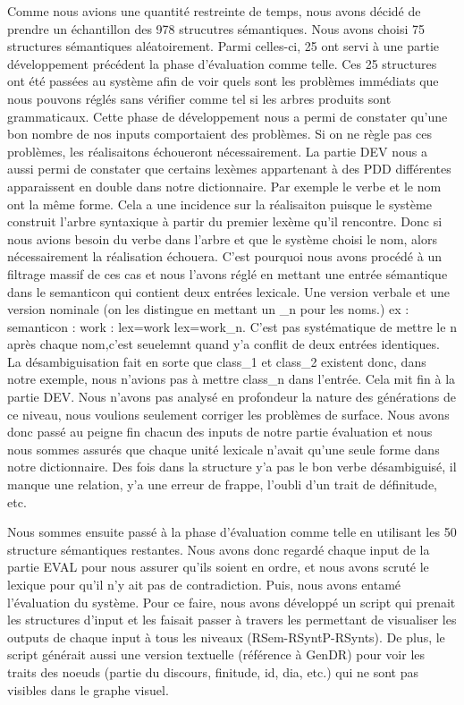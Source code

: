 Comme nous avions une quantité restreinte de temps, nous avons décidé de prendre un échantillon des 978 strucutres sémantiques. Nous avons choisi 75 structures sémantiques  aléatoirement. Parmi celles-ci, 25 ont servi à une partie développement précédent la phase d'évaluation comme telle. Ces 25 structures ont été passées au système afin de voir quels sont les problèmes immédiats que nous pouvons réglés sans vérifier comme tel si les arbres produits sont grammaticaux. Cette phase de développement nous a permi de constater qu'une bon nombre de nos inputs comportaient des problèmes. Si on ne règle pas ces problèmes, les réalisaitons échoueront nécessairement. La partie DEV nous a aussi permi de constater que certains lexèmes appartenant à des PDD différentes apparaissent en double dans notre dictionnaire. Par exemple le verbe  et le nom  ont la même forme. Cela a une incidence sur la réalisaiton puisque le système construit l'arbre syntaxique à partir du premier lexème qu'il rencontre. Donc si nous avions besoin du verbe dans l'arbre et que le système choisi le nom, alors nécessairement la réalisation échouera. C'est pourquoi nous avons procédé à un filtrage massif de ces cas et nous l'avons réglé en mettant une entrée sémantique dans le semanticon qui contient deux entrées lexicale. Une version verbale et une version nominale (on les distingue en mettant un \_n pour les noms.) ex : semanticon : work : lex=work lex=work\_n. C'est pas systématique de mettre le n après chaque nom,c'est seuelemnt quand y'a conflit de deux entrées identiques. La désambiguisation fait en sorte que class\_1 et class\_2 existent donc, dans notre exemple, nous n'avions pas à mettre class\_n dans l'entrée. Cela mit fin à la partie DEV.  Nous n'avons pas analysé en profondeur la nature des générations de ce niveau, nous voulions seulement corriger les problèmes de surface. Nous avons donc passé au peigne fin chacun des inputs de notre partie évaluation et nous nous sommes assurés que chaque unité lexicale n'avait qu'une seule forme dans notre dictionnaire. Des fois dans la structure y'a pas le bon verbe désambiguisé, il manque une relation, y'a une erreur de frappe, l'oubli d'un trait de définitude, etc.

Nous sommes ensuite passé à la phase d'évaluation comme telle en utilisant les 50 structure sémantiques restantes. Nous avons donc regardé chaque input de la partie EVAL pour nous assurer qu'ils soient en ordre, et nous avons scruté le lexique pour qu'il n'y ait pas de contradiction. Puis, nous avons entamé l'évaluation du système. Pour ce faire, nous avons développé un script qui prenait les structures d'input et les faisait passer à travers les permettant de visualiser les outputs de chaque input à tous les niveaux (RSem-RSyntP-RSynts). De plus, le script générait aussi une version textuelle (référence à GenDR) pour voir les traits des noeuds (partie du discours, finitude, id, dia, etc.) qui ne sont pas visibles dans le graphe visuel. 

